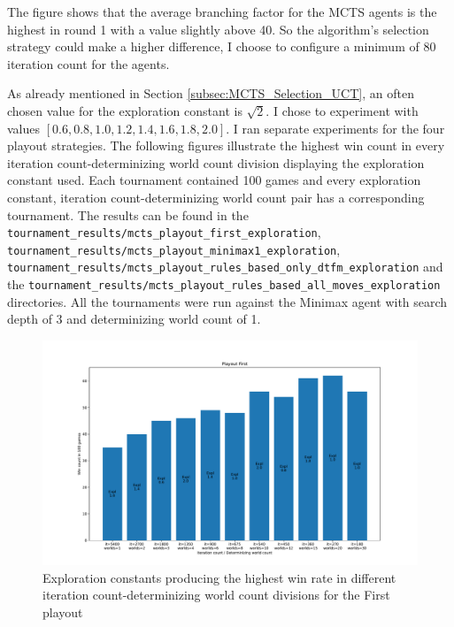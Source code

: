 The figure shows that the average branching factor for the MCTS agents is the highest in round 1 with a value slightly above 40. So the algorithm's selection
strategy could make a higher difference, I choose to configure a minimum of 80 iteration count for the agents. 


As already mentioned in Section \ref{subsec:MCTS_Selection_UCT}, an often chosen value for the exploration constant is $\sqrt{2}$. I chose to experiment with 
values $[0.6, 0.8, 1.0, 1.2, 1.4, 1.6, 1.8, 2.0]$. I ran separate experiments for the four playout strategies. The following figures illustrate the highest
win count in every iteration count-determinizing world count division displaying the exploration constant used. Each tournament contained 100 games and every
exploration constant, iteration count-determinizing world count pair has a corresponding tournament. The results can be found in the \texttt{tournament\_results/mcts\_playout\_first\_exploration},
\texttt{tournament\_results/mcts\_playout\_minimax1\_exploration}, \\ \texttt{tournament\_results/mcts\_playout\_rules\_based\_only\_dtfm\_exploration} and the 
\texttt{tournament\_results/mcts\_playout\_rules\_based\_all\_moves\_exploration} directories. All the tournaments were run against the Minimax agent with search depth of 3
and determinizing world count of 1.

\begin{figure}[H]
    \caption{Exploration constants producing the highest win rate in different iteration count-determinizing world count divisions for the First playout}
    \centerline{\mbox{\includegraphics[width=180mm]{img/mcts_expl_worldcount_First.pdf}}}
    \label{fig:example}
\end{figure}

